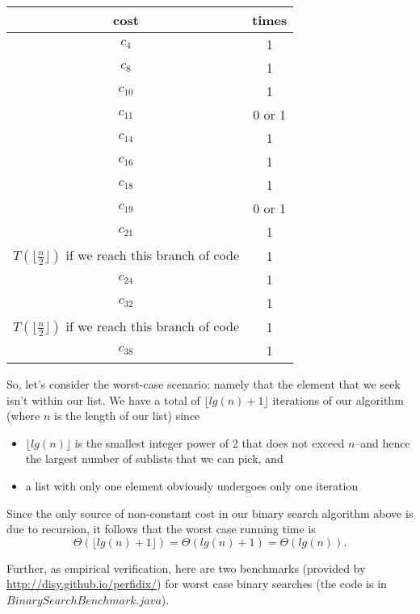 \documentclass{article}
\begin{document}
\begin{tabular}{|c|c|}
\hline 
cost & times \\ 
\hline 
$c_4$ & 1 \\ 
\hline 
$c_8$ & 1 \\ 
\hline 
$c_{10}$ & 1 \\ 
\hline 
$c_{11}$ & 0 or 1 \\ 
\hline 
$c_{14}$ & 1 \\ 
\hline 
$c_{16}$ & 1 \\ 
\hline 
$c_{18}$ & 1 \\ 
\hline 
$c_{19}$ & 0 or 1 \\ 
\hline 
$c_{21}$ & 1 \\ 
\hline 
$T\left(\lfloor \frac{n}{2} \rfloor\right)$ if we reach this branch of code & 1 \\ 
\hline 
$c_{24}$ & 1 \\ 
\hline 
$c_{32}$ & 1 \\ 
\hline 
$T\left(\lfloor \frac{n}{2} \rfloor\right)$ if we reach this branch of code & 1\\ 
\hline 
$c_{38}$ & 1 \\ 
\hline 
 
\end{tabular} 

\bigskip
\bigskip

So, let's consider the worst-case scenario: namely that the element that we seek isn't within our list. We have a total of $\lfloor lg(n) + 1 \rfloor$ iterations of our algorithm (where $n$ is the length of our list) since 

\begin{itemize}
\item $\lfloor lg(n) \rfloor$ is the smallest integer power of 2 that does not exceed $n$--and hence the largest number of sublists that we can pick, and

\item a list with only one element obviously undergoes only one iteration
\end{itemize}

Since the only source of non-constant cost in our binary search algorithm above is due to recursion, it follows that the worst case running time is
\[
	\Theta\left(\lfloor lg(n) + 1 \rfloor\right) = \Theta(lg(n) + 1) = \Theta(lg(n)).
\]

Further, as empirical verification, here are two benchmarks (provided by \href{Perfidix}{http://disy.github.io/perfidix/}) for worst case binary searches (the code is in $BinarySearchBenchmark.java$). 
\end{document}
